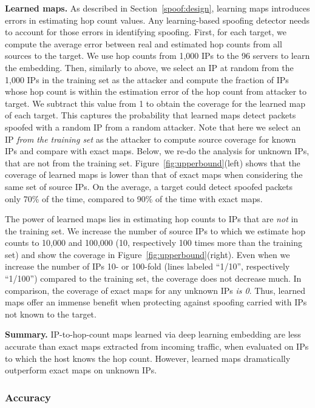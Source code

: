 {\bf Learned maps.} As described in Section~\ref{spoof:design}, learning maps introduces errors in estimating hop count values. Any learning-based spoofing detector needs to account for those errors in identifying spoofing. 
%
First, for each target, we compute the average error between real and estimated hop counts from all sources to the target. We use hop counts from 1,000 IPs to the 96 servers to learn the embedding. 
Then, similarly to above, we select an IP at random from the 1,000 IPs in the training set as the attacker and compute the fraction of IPs whose hop count is within the estimation error of the hop count from attacker to target. We subtract this value from 1 to obtain the coverage for the learned map of each target. This captures the probability that learned maps detect packets spoofed with a random IP from a random attacker. Note that here we select an IP {\em from the training set} as the attacker to compute source coverage for known IPs and compare with exact maps. Below, we re-do the analysis for unknown IPs, that are not from the training set.
%
Figure~\ref{fig:upperbound}(left) shows that the coverage of learned maps is lower than that of exact maps when considering the same set of source IPs. On the average, a target could detect spoofed packets only 70\% of the time, compared to 90\% of the time with exact maps.

The power of learned maps lies in estimating hop counts to IPs that are {\em not} in the training set. We increase the number of source IPs to which we estimate hop counts to 10,000 and 100,000 (10, respectively 100 times more than the training set) and show the coverage in Figure~\ref{fig:upperbound}(right). Even when we increase the number of IPs 10- or 100-fold (lines labeled ``1/10'', respectively ``1/100'') compared to the training set, the coverage does not decrease much. In comparison, the coverage of exact maps for any unknown IPs {\em is 0}. Thus, learned maps offer an immense benefit when protecting against spoofing carried with IPs not known to the target.


{\bf Summary.}
IP-to-hop-count maps learned via deep learning embedding are less accurate than exact maps extracted from incoming traffic, when evaluated on IPs to which the host knows the hop count. However, learned maps dramatically outperform exact maps on unknown IPs.




\subsubsection{Accuracy}

